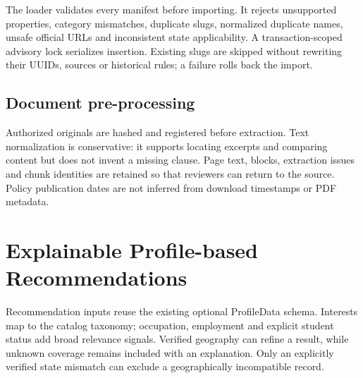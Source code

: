 \documentclass[12pt,a4paper,twoside]{report}
\begin{document}
The loader validates every manifest before importing. It rejects unsupported properties, category mismatches, duplicate slugs, normalized duplicate names, unsafe official URLs and inconsistent state applicability. A transaction-scoped advisory lock serializes insertion. Existing slugs are skipped without rewriting their UUIDs, sources or historical rules; a failure rolls back the import.

\subsection*{Document pre-processing}

Authorized originals are hashed and registered before extraction. Text normalization is conservative: it supports locating excerpts and comparing content but does not invent a missing clause. Page text, blocks, extraction issues and chunk identities are retained so that reviewers can return to the source. Policy publication dates are not inferred from download timestamps or PDF metadata.

\section{Explainable Profile-based Recommendations}

Recommendation inputs reuse the existing optional ProfileData schema. Interests map to the catalog taxonomy; occupation, employment and explicit student status add broad relevance signals. Verified geography can refine a result, while unknown coverage remains included with an explanation. Only an explicitly verified state mismatch can exclude a geographically incompatible record.
\end{document}
